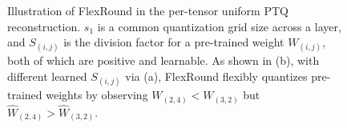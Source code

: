 \documentclass{article}
\theoremstyle{plain}
\theoremstyle{definition}
\theoremstyle{remark}
\begin{document}
\begin{figure}
    \vskip -0.05in
    \centering
    \vskip -0.1in
    \caption{Illustration of FlexRound in the per-tensor uniform PTQ reconstruction. $s_1$ is a common quantization grid size across a layer, and $S_{(i, j)}$ is the division factor for a pre-trained weight $W_{(i, j)}$, both of which are positive and learnable. As shown in (b), with different learned $S_{(i, j)}$ via (a), FlexRound flexibly quantizes pre-trained weights by observing $W_{(2, 4)} < W_{(3, 2)}$ but $\widehat{W}_{(2, 4)} > \widehat{W}_{(3, 2)}$.}
    \label{fig:FlexRound}
    \vskip -0.15in
\end{figure}
\end{document}
